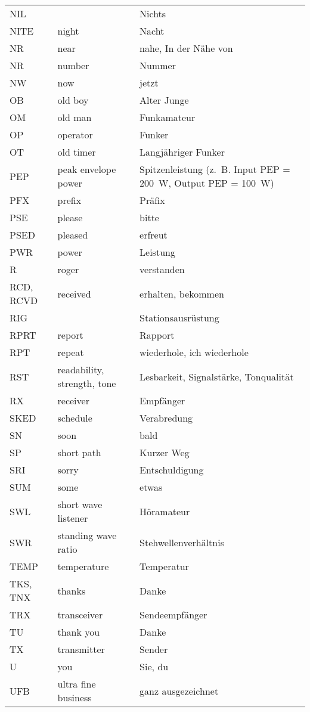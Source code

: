 {\begin{xtabular}{lll}
NIL &  & Nichts \\
NITE & night & Nacht \\
NR & near & nahe, In der Nähe von \\
NR & number & Nummer \\
NW & now & jetzt \\
OB & old boy & Alter Junge \\
OM & old man & Funkamateur \\
OP & operator & Funker \\
OT & old timer & Langjähriger Funker \\
PEP & peak envelope power & \parbox[t]{4cm}{Spitzenleistung (z. B. Input PEP = 200 W, Output PEP = 100 W)} \\
PFX & prefix & Präfix \\
PSE & please & bitte \\
PSED & pleased & erfreut \\
PWR & power & Leistung \\
R & roger & verstanden \\
RCD, RCVD & received & erhalten, bekommen \\
RIG &  & Stationsausrüstung \\
RPRT & report & Rapport \\
RPT & repeat & wiederhole, ich wiederhole \\
RST & readability, strength, tone & Lesbarkeit, Signalstärke, Tonqualität \\
RX & receiver & Empfänger \\
SKED & schedule & Verabredung \\
SN & soon & bald \\
SP & short path & Kurzer Weg \\
SRI & sorry & Entschuldigung \\
SUM & some & etwas \\
SWL & short wave listener & Höramateur \\
SWR & standing wave ratio & Stehwellenverhältnis \\
TEMP & temperature & Temperatur \\
TKS, TNX & thanks & Danke \\
TRX & transceiver & Sendeempfänger \\
TU & thank you & Danke \\
TX & transmitter & Sender \\
U & you & Sie, du \\
UFB & ultra fine business & ganz ausgezeichnet \\

\end{xtabular}}

